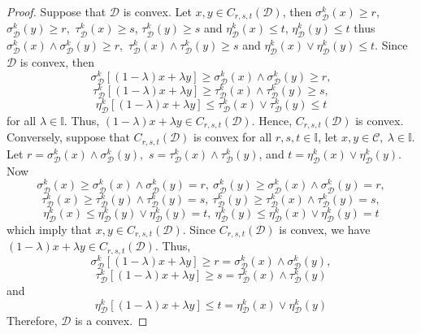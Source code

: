 \documentclass[12pt,letterpaper]{amsart}
\theoremstyle{plain}
\theoremstyle{definition}
\numberwithin{equation}{section}
\begin{document}
\begin{proof} Suppose that $\mathcal{D}$ is convex. Let $x, y \in  C_{r, s, t} (\mathcal{D})$, then $\sigma^k_{\mathcal{D}} (x) \geq r$, $\sigma^k_{\mathcal{D}} (y) \geq r,$ $\tau^k_{\mathcal{D}} (x) \geq s$, $\tau^k_{\mathcal{D}} (y) \geq s$ and $\eta^k_{\mathcal{D}} (x) \leq t$, $\eta^k_{\mathcal{D}} (y) \leq t$ thus $\sigma^k_{\mathcal{D}}(x) \wedge \sigma^k_{\mathcal{D}}(y) \geq r,$ $\tau^k_{\mathcal{D}}(x) \wedge \tau^k_{\mathcal{D}}(y) \geq s$ and $\eta^k_{\mathcal{D}}(x) \vee \eta^k_{\mathcal{D}}(y) \leq t$. Since $\mathcal{D}$ is convex, then $$\sigma^k_{\mathcal{D}} [(1 - \lambda)x + \lambda y] \geq \sigma^k_{\mathcal{D}}(x) \wedge \sigma^k_{\mathcal{D}}(y) \geq r,$$ $$\tau^k_{\mathcal{D}} [(1 - \lambda)x + \lambda y] \geq \tau^k_{\mathcal{D}}(x) \wedge \tau^k_{\mathcal{D}}(y) \geq s,$$ $$\eta^k_{\mathcal{D}} [(1 - \lambda)x + \lambda y] \leq \tau^k_{\mathcal{D}}(x) \vee \tau^k_{\mathcal{D}}(y) \leq t$$ for all $\lambda \in \mathbb{I}$. Thus, $(1 - \lambda)x + \lambda y \in C_{r, s, t} (\mathcal{D})$. Hence, $C_{r, s, t} (\mathcal{D})$ is convex.\\ Conversely, suppose that $C_{r, s, t} (\mathcal{D})$ is convex for all $r, s, t \in \mathbb{I}$, let $x, y \in \mathcal{C},~ \lambda \in \mathbb{I}$. Let $ r =\sigma^k_{\mathcal{D}}(x) \wedge \sigma^k_{\mathcal{D}}(y),$ $s = \tau^k_{\mathcal{D}}(x) \wedge \tau^k_{\mathcal{D}}(y)$, and $t = \eta^k_{\mathcal{D}}(x) \vee \eta^k_{\mathcal{D}}(y)$. Now $$\sigma^k_{\mathcal{D}}(x) \geq \sigma^k_{\mathcal{D}}(x) \wedge \sigma^k_{\mathcal{D}}(y) = r,~ \sigma^k_{\mathcal{D}}(y) \geq \sigma^k_{\mathcal{D}}(x) \wedge \sigma^k_{\mathcal{D}}(y) = r,$$ $$\tau^k_{\mathcal{D}}(x) \geq \tau^k_{\mathcal{D}}(y) \wedge \tau^k_{\mathcal{D}}(y) = s,~ \tau^k_{\mathcal{D}}(y) \geq \tau^k_{\mathcal{D}}(x) \wedge \tau^k_{\mathcal{D}}(y) = s,$$ $$\eta^k_{\mathcal{D}}(x) \leq \eta^k_{\mathcal{D}}(y) \vee \eta^k_{\mathcal{D}}(y) = t,~ \eta^k_{\mathcal{D}}(y) \leq \eta^k_{\mathcal{D}}(x) \vee \eta^k_{\mathcal{D}}(y) = t$$ which imply that $x, y \in C_{r, s, t} (\mathcal{D})$. Since $C_{r, s, t} (\mathcal{D})$ is convex, we have $(1 - \lambda)x + \lambda y \in C_{r, s, t} (\mathcal{D}).$ Thus, $$\sigma^k_{\mathcal{D}} [(1 - \lambda)x + \lambda y] \geq r = \sigma^k_{\mathcal{D}}(x) \wedge \sigma^k_{\mathcal{D}}(y),$$ $$\tau^k_{\mathcal{D}} [(1 - \lambda)x + \lambda y] \geq s = \tau^k_{\mathcal{D}}(x) \wedge \tau^k_{\mathcal{D}}(y)$$ and $$\eta^k_{\mathcal{D}} [(1 - \lambda)x + \lambda y] \leq t = \eta^k_{\mathcal{D}}(x) \vee \eta^k_{\mathcal{D}}(y)$$ Therefore, $\mathcal{D}$ is a convex.
\end{proof}
\end{document}
